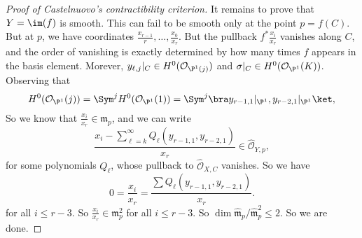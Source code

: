 \documentclass[a4paper]{article}
\begin{document}
\begin{proof}[Proof of Castelnuovo's contractibility criterion]
  It remains to prove that $Y = \im (f)$ is smooth. This can fail to be smooth only at the point $p = f(C)$. But at $p$, we have coordinates $\frac{x_{r - 1}}{r}, \ldots, \frac{x_0}{x_r}$. But the pullback $f^* \frac{x_i}{x_r}$ vanishes along $C$, and the order of vanishing is exactly determined by how many times $f$ appears in the basis element. Morever, $y_{\ell, j}|_C \in H^0(\mathcal{O}_{\P^1(j)})$ and $\sigma|_C  \in H^0(\mathcal{O}_{\P^1}(K))$. Observing that
  \[
    H^0(\mathcal{O}_{\P^1}(j)) = \Sym^j  H^0(\mathcal{O}_{\P^1}(1)) = \Sym^j \bra y_{r - 1, 1}|_{\P^1}, y_{r - 2, 1}|_{\P^1} \ket,
  \]
  So we know that $\frac{x_i}{x_r} \in \mathfrak{m}_p$, and we can write
  \[
    \frac{x_i - \sum^\infty_{\ell = k} Q_\ell(y_{r - 1, 1}, y_{r - 2, 1})}{x_r} \in \hat{\mathcal{O}}_{Y, p}, %
  \]
  for some polynomials $Q_{\ell}$, whose pullback to $\hat{\mathcal{O}}_{X, C}$ vanishes. So we have
  \[
    0 = \frac{x_i}{x_r} = \frac{\sum Q_\ell(y_{r - 1, 1}, y_{r - 2, 1})}{x_r}.
  \]
  for all $i \leq r - 3$. So $\frac{x_i}{x_r} \in \mathfrak{m}_p^2$ for all $i \leq r - 3$. So $\dim \hat{\mathfrak{m}}_p/\hat{\mathfrak{m}}_p^2 \leq 2$. So we are done.
\end{proof}
\printindex
\end{document}
